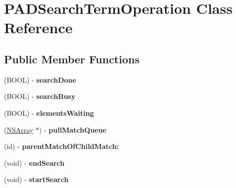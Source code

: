 \hypertarget{interface_p_a_d_search_term_operation}{
\section{PADSearchTermOperation Class Reference}
\label{interface_p_a_d_search_term_operation}
}
\subsection*{Public Member Functions}
\begin{DoxyCompactItemize}
\item 
\hypertarget{interface_p_a_d_search_term_operation_a983cb25f384fd434b2b1cf91e1921716}{
(BOOL) -\/ {\bfseries searchDone}}
\label{interface_p_a_d_search_term_operation_a983cb25f384fd434b2b1cf91e1921716}

\item 
\hypertarget{interface_p_a_d_search_term_operation_a572e3e70c70383dab2bc5005267390e4}{
(BOOL) -\/ {\bfseries searchBusy}}
\label{interface_p_a_d_search_term_operation_a572e3e70c70383dab2bc5005267390e4}

\item 
\hypertarget{interface_p_a_d_search_term_operation_ad13d7379c156550705e79420b6b7ce28}{
(BOOL) -\/ {\bfseries elementsWaiting}}
\label{interface_p_a_d_search_term_operation_ad13d7379c156550705e79420b6b7ce28}

\item 
\hypertarget{interface_p_a_d_search_term_operation_af7f1ddf11bdab015efd2e62e1dcf982a}{
(\hyperlink{class_n_s_array}{NSArray} $\ast$) -\/ {\bfseries pullMatchQueue}}
\label{interface_p_a_d_search_term_operation_af7f1ddf11bdab015efd2e62e1dcf982a}

\item 
\hypertarget{interface_p_a_d_search_term_operation_a083c9c796a144a20679b7808056bd51f}{
(id) -\/ {\bfseries parentMatchOfChildMatch:}}
\label{interface_p_a_d_search_term_operation_a083c9c796a144a20679b7808056bd51f}

\item 
\hypertarget{interface_p_a_d_search_term_operation_a5c0b986cdd173d66954b9b98ab002f03}{
(void) -\/ {\bfseries endSearch}}
\label{interface_p_a_d_search_term_operation_a5c0b986cdd173d66954b9b98ab002f03}

\item 
\hypertarget{interface_p_a_d_search_term_operation_a4fb73bd3c4515dcf3efad3bcf7888a17}{
(void) -\/ {\bfseries startSearch}}
\label{interface_p_a_d_search_term_operation_a4fb73bd3c4515dcf3efad3bcf7888a17}


\end{DoxyCompactItemize}
